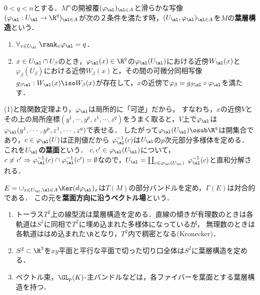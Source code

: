 \documentclass[uplatex,dvipdfmx]{jsreport}
\begin{document}
\begin{definition}[foliation]
    $0<q<n$とする．$M^n$の開被覆$(\varphi_\al)_{\al\in A}$と滑らかな写像$(\varphi_\al:U_\al\to\R^q)_{\al\in A}$が次の２条件を満たす時，$(U_\al,\varphi_\al)_{\al\in A}$を$M$の\textbf{葉層構造}という．
    \begin{enumerate}
        \item $\forall_{x\in U_\al}\;\rank_x\varphi_\al=q$．
        \item $x\in U_\al\cap U_\beta$のとき，$\varphi_\al(x)\in\R^q$の$\varphi_\al(U_\al)$における近傍$W_\al(x)$と$\varphi_\beta(U_\beta)$における近傍$W_\beta(x)$と，その間の可微分同相写像$g_{\beta\al}:W_\al(x)\iso W_\beta(x)$が存在して，$x$の近傍で$\varphi_\beta=g_{\beta\al}\circ\varphi_\al$を満たす．
    \end{enumerate}
\end{definition}

\begin{definition}[leaves]
    (1)と陰関数定理より，$\varphi_\al$は局所的に「可逆」だから，
    すなわち，$x$の近傍$V$とその上の局所座標$(y^1,\cdots,y^p,z^1,\cdots,z^q)$をうまく取ると，$V$上で$\varphi_\al$は$\varphi_\al(y^1,\cdots,y^p,z^1,\cdots,z^q)$で表せる．
    したがって$\varphi_\al(U_\al)\osub\R^q$は開集合であり，$c\in\varphi_\al(U)$は正則値だから
    $\varphi_\al^{-1}(c)$は$U_\al$の$p$次元部分多様体を定める．
    これを\textbf{$U_\al$の葉面}という．
    $c,c'\in\varphi_\al(U_\al)$について，$c\ne c'\Rightarrow\varphi_\al^{-1}(c)\cap\varphi_\al^{-1}(c')=\emptyset$なので，$U_\al=\coprod_{c\in\varphi_\al(U_\al)}\;\varphi_{\al}^{-1}(c)$と直和分解される．
\end{definition}

\begin{definition}
    $E=\cup_{x\in U_\al,\al\in A}\Ker(d\varphi_\al)_x$は$T(M)$の部分バンドルを定め，$\Gamma(E)$は対合的である．
    この元を\textbf{葉面方向に沿うベクトル場}という．
\end{definition}

\begin{example}[foliation]\mbox{}
    \begin{enumerate}
        \item トーラス$T^2$上の線型流は葉層構造を定める．直線の傾きが有理数のときは各軌道は$S^1$に同相で$T^2$に埋め込まれた多様体になっているが，
        無理数のときは各軌道ははめ込まれた$\R$となり，$T^2$内で稠密となる(Kronecker)．
        \item $S^2\subset\R^3$を$xy$平面と平行な平面で切った切り口全体は$S^2$に葉層構造を定める．
        \item ベクトル束，$\GL_p(K)$-主バンドルなどは，各ファイバーを葉面とする葉層構造を持つ．
    \end{enumerate}
\end{example}
\end{document}
